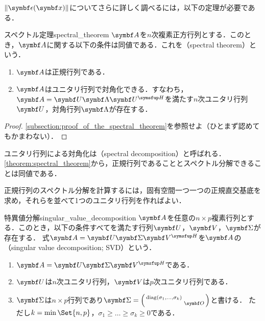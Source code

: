 \documentclass[../../main]{subfiles}
\begin{document}
\(\vnorm{\vect{\epsilon}(\vect{x})}\)についてさらに詳しく調べるには，以下の定理が必要である．

\begin{theorem}{スペクトル定理}{spectral_theorem}
  \(\mat{A}\)を\(n\)次複素正方行列とする．このとき，\(\mat{A}\)に関する以下の条件は同値である．これを（spectral theorem）という．
  \begin{enumerate}
    \item \(\mat{A}\)は正規行列である．
    \item \(\mat{A}\)はユニタリ行列で対角化できる．すなわち，\(\mat{A}=\mat{U}\mat{\Lambda}\htrps{\mat{U}}\)を満たす\(n\)次ユニタリ行列\(\mat{U}\)，対角行列\(\mat{\Lambda}\)が存在する．
  \end{enumerate}
\end{theorem}

\begin{proof}
  \cref{subsection:proof_of_the_spectral_theorem}を参照せよ（ひとまず認めてもかまわない）．
\end{proof}

ユニタリ行列による対角化は（spectral decomposition）と呼ばれる．
\cref{theorem:spectral_theorem}から，正規行列であることとスペクトル分解できることは同値である．

\begin{note}
  正規行列のスペクトル分解を計算するには，固有空間一つ一つの正規直交基底を求め，それらを並べて1つのユニタリ行列を作ればよい．
\end{note}

\begin{corollary}{特異値分解}{singular_value_decomposition}
  \(\mat{A}\)を任意の\(n\times p\)複素行列とする．このとき，以下の条件すべてを満たす行列\(\mat{U}\)，\(\mat{V}\)，\(\mat{\Sigma}\)が存在する．
  式\(\mat{A}=\mat{U}\mat{\Sigma}\htrps{\mat{V}}\)を\(\mat{A}\)の（singular value decomposition; SVD）という．
  \begin{enumerate}
    \item \(\mat{A}=\mat{U}\mat{\Sigma}\htrps{\mat{V}}\)である．
    \item \(\mat{U}\)は\(n\)次ユニタリ行列，\(\mat{V}\)は\(p\)次ユニタリ行列である．
    \item \(\mat{\Sigma}\)は\(n\times p\)行列であり\(\mat{\Sigma}=\smallmatrice{\diag(\sigma_1,\dots,\sigma_k) & \\ & \zmat}\)と書ける．
      ただし\(k=\min\Set{n,p}\)，\(\sigma_1\geq\dots\geq\sigma_k\geq 0\)である．
  \end{enumerate}
\end{corollary}
\end{document}
